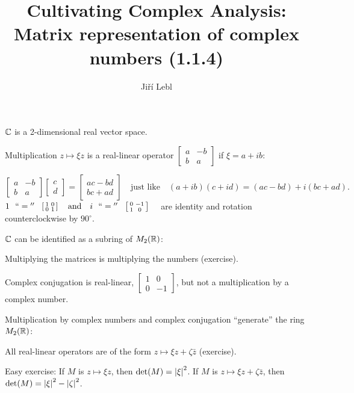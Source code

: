 \documentclass[10pt,aspectratio=169]{beamer}
\author{Ji\v{r}\'i Lebl}
\institute[OSU]{%
Departemento pri Matematiko de Oklahoma {\^S}tata Universitato}
\title{Cultivating Complex Analysis:\\%
Matrix representation of complex numbers (1.1.4)}
\date{}
\begin{document}
\begin{frame}
\titlepage
\end{frame}

\begin{frame}
${\mathbb{C}}$ is a 2-dimensional real vector space.

\pause
\medskip

Multiplication $z \mapsto \xi z$ is a real-linear operator
\(
\left[
\begin{smallmatrix}
a & -b \\
b & a
\end{smallmatrix}
\right]
\) if $\xi = a+ib$:

\pause
\[
\begin{bmatrix}
a & -b \\
b & a
\end{bmatrix}
\begin{bmatrix}
c \\
d 
\end{bmatrix}
=
\begin{bmatrix}
ac-bd \\
bc+ad
\end{bmatrix}
\quad
\text{just like}
\quad
(a+ib)(c+id) = (ac-bd) + i(bc+ad) .
\]
\pause
\medskip
$
1 ~~ ``{}={}'' ~~
\left[
\begin{smallmatrix}
1 & 0 \\
0 & 1
\end{smallmatrix}
\right]
\quad \text{and} \quad
i ~~ ``{}={}'' ~~ \left[
\begin{smallmatrix}
0 & -1 \\
1 & 0
\end{smallmatrix} 
\right]
\quad
$
are identity and rotation counterclockwise by $90^{\circ}$.

\pause
\medskip

${\mathbb{C}}$ can be identified as a subring of $M_2({\mathbb{R}})$:

Multiplying the matrices
is multiplying the numbers (exercise).

\medskip
\pause

Complex conjugation is real-linear,
$\left[ \begin{smallmatrix} 1 & 0 \\ 0 &
-1 \end{smallmatrix} \right]$,
but not a multiplication by a complex number.

\pause
\medskip

Multiplication by complex numbers and complex conjugation ``generate''
the ring $M_2({\mathbb{R}})$:

All real-linear operators are of the form
$z \mapsto \xi z + \zeta \bar{z}$ (exercise).

\pause
\medskip

Easy exercise:
If $M$ is $z \mapsto \xi z$, then $\det(M) = \left\lvert {\xi} \right\rvert^2$.
If $M$ is $z \mapsto \xi z+ \zeta \bar{z}$, then $\det(M) =
\left\lvert {\xi} \right\rvert^2-\left\lvert {\zeta} \right\rvert^2$.

\end{frame}
\end{document}
